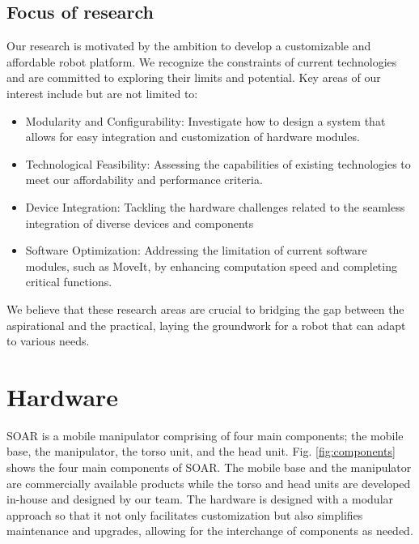 \documentclass[runningheads,a4paper]{llncs}
\begin{document}
\subsection{Focus of research}
Our research is motivated by the ambition to develop a customizable and affordable robot platform.
We recognize the constraints of current technologies and are committed to exploring their limits and potential. Key areas of our interest include but are not limited to:
\begin{itemize}
	\item Modularity and Configurability: Investigate how to design a system that allows for easy integration and customization of hardware modules.
	\item Technological Feasibility: Assessing the capabilities of existing technologies to meet our affordability and performance criteria.
	\item Device Integration: Tackling the hardware challenges related to the seamless integration of diverse devices and components
	\item Software Optimization: Addressing the limitation of current software modules, such as MoveIt, by enhancing computation speed and completing critical functions.
\end{itemize}
We believe that these research areas are crucial to bridging the gap between the aspirational and the practical, laying the groundwork for a robot that can adapt to various needs.

\section{Hardware}
SOAR is a mobile manipulator comprising of four main components; the mobile base, the manipulator, the torso unit, and the head unit.
Fig. \ref{fig:components} shows the four main components of SOAR.
The mobile base and the manipulator are commercially available products while the torso and head units are developed in-house and designed by our team.
The hardware is designed with a modular approach so that it not only facilitates customization but also simplifies maintenance and upgrades, allowing for the interchange of components as needed.
\end{document}
